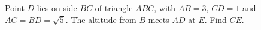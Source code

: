 Point $D$ lies on side $BC$ of triangle $ABC$, with $AB=3$, $CD=1$ and $AC=BD=\sqrt5$. The altitude from $B$ meets $AD$ at $E$. Find $CE$.
